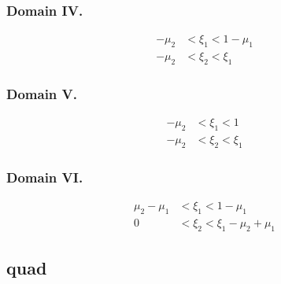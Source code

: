 \documentclass{article}
\begin{document}
\subsubsection{Domain IV.}
%
%
\begin{align}
-\mu_2 &< \xi_1 < 1-\mu_1 \nonumber \\
-\mu_2 &< \xi_2 < \xi_1 \nonumber
\end{align}



\subsubsection{Domain V.}
%
%
\begin{align}
-\mu_2 &< \xi_1 < 1 \nonumber \\
-\mu_2 &< \xi_2 < \xi_1 \nonumber
\end{align}


\subsubsection{Domain VI.}
%
%
\begin{align}
\mu_2-\mu_1 &< \xi_1 < 1-\mu_1 \nonumber \\
0 &< \xi_2 < \xi_1 - \mu_2+\mu_1\nonumber
\end{align}



\subsection{quad}

\newcommand{\commonquad}{
\path [draw=gray] (1,-1) -- (1,1) -- (-1,1) -- (-1,-1) -- cycle;
\path [draw=gray] (-1,0) -- (1,0);
\path [draw=gray] (0,-1) -- (0,1);
\path [draw, ->] (-1.2,0) -- (1.2,0) node [anchor = west] {$\xi_1$};
\path [draw, ->] (0,-1.2) -- (0,1.2) node [anchor = south] {$\xi_2$};
\path [fill=red, opacity=.5] (0-\m,0-\p) -- (1-\m,0-\p) -- (1-\m,1-\p) -- (0-\m,1-\p) -- cycle;
\path [fill = blue, opacity=.5] (0,0) -- (1,0) -- (1,1) -- (0,1) -- cycle;
\path [draw, fill] (\m,\p) circle(.03) -- (-\m,-\p) circle(.03);
}
\end{document}
